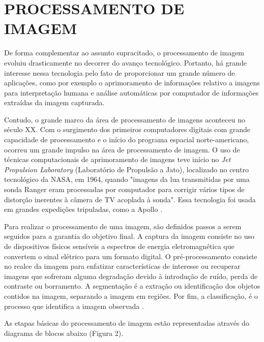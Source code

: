 \section{{PROCESSAMENTO DE IMAGEM}}

De forma complementar ao assunto supracitado, o processamento de imagem evoluiu drasticamente no decorrer do avanço tecnológico. Portanto, há grande interesse nessa tecnologia pelo fato de proporcionar um grande número de aplicações, como por exemplo o aprimoramento de informações relativo a imagens para interpretação humana e análise automáticas por computador de informações extraídas da imagem capturada.

Contudo, o grande marco da área de processamento de imagens aconteceu no século XX. Com o surgimento dos primeiros computadores digitais com grande capacidade de processamento e o início do programa espacial norte-americano, ocorreu um grande impulso na área de processamento de imagem. O uso de técnicas computacionais de aprimoramento de imagens teve início no \textit{Jet Propulsion Laboratory} (Laboratório de Propulsão a Jato), localizado no centro tecnológico da NASA, em 1964, quando "imagens da lua transmitidas por uma sonda Ranger eram processadas por computador para corrigir vários tipos de distorção inerentes à câmera de TV acoplada à sonda". Essa tecnologia foi usada em grandes expedições tripuladas, como a Apollo \cite{FILHO1999}.

Para realizar o processamento de uma imagem, são definidos passos a serem seguidos para a garantia do objetivo final. A captura da imagem consiste no uso de dispositivos físicos sensíveis a espectros de energia eletromagnética que convertem o sinal elétrico para um formato digital. O pré-processamento consiste no realce da imagem para enfatizar características de interesse ou recuperar imagens que sofreram alguma degradação devido à introdução de ruído, perda de contraste ou borramento. A segmentação é a extração ou identificação dos objetos contidos na imagem, separando a imagem em regiões. Por fim, a classificação, é o processo que identifica a imagem observada \cite{GONZALEZ2002}.

As etapas básicas do processamento de imagem estão representadas através do diagrama de blocos abaixo (Figura 2).

